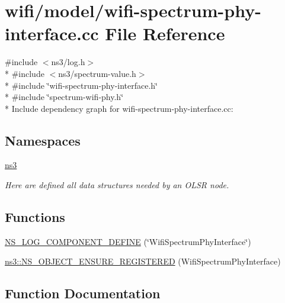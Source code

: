 \hypertarget{wifi-spectrum-phy-interface_8cc}{}\section{wifi/model/wifi-\/spectrum-\/phy-\/interface.cc File Reference}
\label{wifi-spectrum-phy-interface_8cc}
{\ttfamily \#include $<$ns3/log.\+h$>$}\\*
{\ttfamily \#include $<$ns3/spectrum-\/value.\+h$>$}\\*
{\ttfamily \#include \char`\"{}wifi-\/spectrum-\/phy-\/interface.\+h\char`\"{}}\\*
{\ttfamily \#include \char`\"{}spectrum-\/wifi-\/phy.\+h\char`\"{}}\\*
Include dependency graph for wifi-\/spectrum-\/phy-\/interface.cc\+:
\subsection*{Namespaces}
\begin{DoxyCompactItemize}
\item 
 \hyperlink{namespacens3}{ns3}
\begin{DoxyCompactList}\small\item\em Here are defined all data structures needed by an O\+L\+SR node. \end{DoxyCompactList}\end{DoxyCompactItemize}
\subsection*{Functions}
\begin{DoxyCompactItemize}
\item 
\hyperlink{wifi-spectrum-phy-interface_8cc_a703202d3e8227cd70a954f60f8aa4619}{N\+S\+\_\+\+L\+O\+G\+\_\+\+C\+O\+M\+P\+O\+N\+E\+N\+T\+\_\+\+D\+E\+F\+I\+NE} (\char`\"{}Wifi\+Spectrum\+Phy\+Interface\char`\"{})
\item 
\hyperlink{namespacens3_acc9da1cc92b386cd917d9717a8194937}{ns3\+::\+N\+S\+\_\+\+O\+B\+J\+E\+C\+T\+\_\+\+E\+N\+S\+U\+R\+E\+\_\+\+R\+E\+G\+I\+S\+T\+E\+R\+ED} (Wifi\+Spectrum\+Phy\+Interface)
\end{DoxyCompactItemize}


\subsection{Function Documentation}
